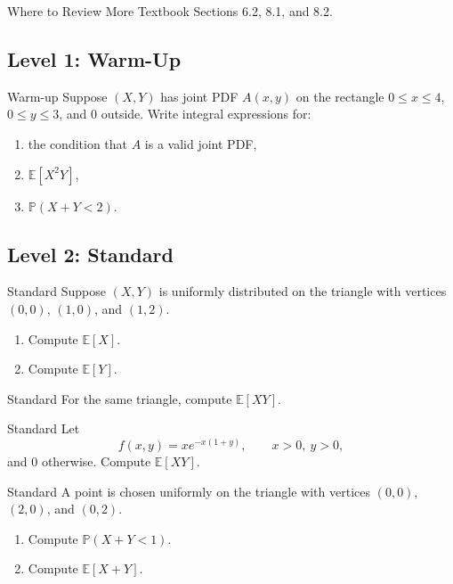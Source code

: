 \documentclass[12pt]{article}
\newcommand{\EE}{\mathbb{E}}
\newcommand{\PP}{\mathbb{P}}
\newcommand{\writespace}[1]{\vspace*{#1}}
\newcommand{\longws}{\writespace{2.8cm}}
\newcommand{\xlongws}{\writespace{4.1cm}}
\newcounter{problem}[section]
\begin{document}
\begin{reviewbox}{Where to Review More}
Textbook Sections 6.2, 8.1, and 8.2.
\end{reviewbox}

\subsection*{Level 1: Warm-Up}

\begin{practiceproblem}{Warm-up}
Suppose $(X,Y)$ has joint PDF $A(x,y)$ on the rectangle $0\le x\le 4$, $0\le y\le 3$, and $0$ outside. Write integral expressions for:
\begin{enumerate}
  \item the condition that $A$ is a valid joint PDF,
  \item $\EE[X^2Y]$,
  \item $\PP(X+Y<2)$.
\end{enumerate}
\end{practiceproblem}
\longws

\subsection*{Level 2: Standard}

\begin{practiceproblem}{Standard}
Suppose $(X,Y)$ is uniformly distributed on the triangle with vertices $(0,0)$, $(1,0)$, and $(1,2)$.
\begin{enumerate}
  \item Compute $\EE[X]$.
  \item Compute $\EE[Y]$.
\end{enumerate}
\end{practiceproblem}
\longws

\begin{practiceproblem}{Standard}
For the same triangle, compute $\EE[XY]$.
\end{practiceproblem}
\longws

\begin{practiceproblem}{Standard}
Let
\[
  f(x,y)=x e^{-x(1+y)},\qquad x>0,\ y>0,
\]
and $0$ otherwise. Compute $\EE[XY]$.
\end{practiceproblem}
\xlongws

\begin{practiceproblem}{Standard}
A point is chosen uniformly on the triangle with vertices $(0,0)$, $(2,0)$, and $(0,2)$.
\begin{enumerate}
  \item Compute $\PP(X+Y<1)$.
  \item Compute $\EE[X+Y]$.
\end{enumerate}
\end{practiceproblem}
\longws
\end{document}
